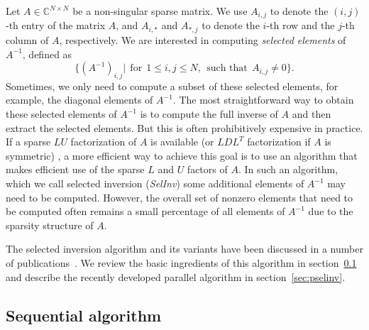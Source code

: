 \documentclass{acm_proc_article-sp}
\begin{document}
Let $A\in \mathbb{C}^{N\times N}$ be a non-singular sparse matrix.  
We use $A_{i,j}$ to denote the $(i,j)$-th entry of the matrix $A$, 
and $A_{i,*}$ and $A_{*,j}$ to denote the $i$-th row and the $j$-th column
of $A$, respectively.  We are interested in computing 
{\em selected elements} of $A^{-1}$, defined as
\begin{equation}
  \{(A^{-1})_{i,j}\vert \ \ \mbox{for} \ \ 1\le i,j\le N, \ \ 
  \mbox{such that} \ \ A_{i,j}\ne 0 \}.
  \label{eqn:selelem}
\end{equation}
Sometimes, we only need to compute a subset of these selected elements,
for example, the diagonal elements of $A^{-1}$. The most
straightforward way to obtain these selected elements of $A^{-1}$ is to
compute the full inverse of $A$ and then extract the selected elements.
But this is often prohibitively expensive in practice. 
If a sparse $LU$ factorization  of $A$ is available
(or $LDL^{T}$ factorization if $A$ is symmetric) , a more efficient way 
to achieve this goal is to use an algorithm that makes efficient use 
of the sparse $L$ and $U$ factors of $A$.  In such an algorithm, 
which we call selected inversion ({\em SelInv}) some 
additional elements of $A^{-1}$ may need to be computed. However, the overall 
set of nonzero elements that need to be computed often remains a small 
percentage of all elements of $A^{-1}$ due to the sparsity structure of $A$.

The selected inversion algorithm and its variants have been discussed
in a number of publications~\cite{TakahashiFaganChin1973,ErismanTinney1975,CampbellDavis1995,LiAhmedKlimeckDarve2008,LiDarve2012,LiWuDarve2013,HetmaniukZhaoAnantram2013,AmestoyDuffLExcellentEtAl2012,AmestoyDuffLExcellentEtAl2012a,PetersenLiStokbroEtAl2009,LinLuYingE2009,LinLuYingCarE2009,LinYangMezaEtAl2011,LinYangLuEtAl2011}.
We review the basic ingredients of this algorithm in section~\ref{subsec:basic} 
and describe the recently developed parallel algorithm in section~\ref{sec:pselinv}.

\subsection{Sequential algorithm} \label{subsec:basic}
\end{document}
